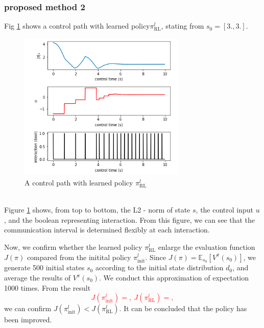 \documentclass[english, dvipdfmx]{ampmt}             %
\newcommand{\unc}[1]{\textcolor{red}{#1}} %
\newcommand{\expect}{\mathbb{E}}
\begin{document}
\subsubsection{proposed method 2}
Fig \ref{path_l} shows a control path with learned policy$\pi^l_{\textrm{RL}}$, stating from $s_0 = [3., 3.]$.
\begin{figure}[h]
	\centering
 	\includegraphics[width=8cm]{path_l.png}
 	\caption{A control path with learned policy $\pi^l_{\textrm{RL}}$} \label{path_l}
\end{figure}\\
Figure \ref{path_l} shows, from top to bottom, the L2 - norm of state $s$, the control input $u$, and the boolean representing interaction. From this figure, we can see that the communication interval is determined flexibly at each interaction.\par
Now, we confirm whether the learned policy $\pi^l_{\textrm{RL}}$ enlarge the evaluation function $J(\pi)$ compared from the initital policy $\pi^l_{\textrm{init}}$. Since $J(\pi) = \expect_{s_0}[V^{\pi}(s_0)]$, we generate 500 initial states $s_0$ according to the initial state distribution $d_0$, and average the results of $V^{\pi}(s_0)$. We conduct this approximation of expectation 1000 times. From the result
\unc{
\begin{equation}
	J(\pi^l_{\textrm{init}}) = , ~J(\pi^l_{\textrm{RL}}) = , 
\end{equation}
}
we can confirm $J(\pi^l_{\textrm{init}}) < J(\pi^l_{\textrm{RL}})$. It can be concluded that the policy has been improved.
\end{document}
